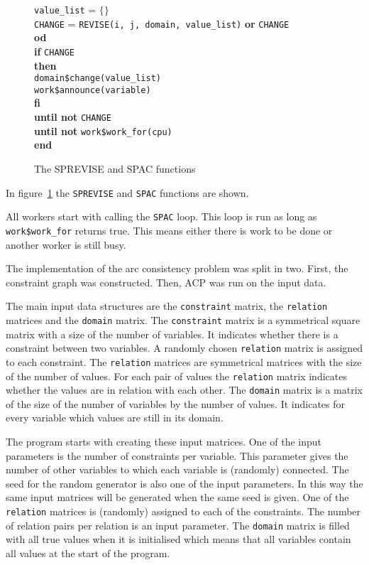 \documentclass[a4paper,11pt]{article}
\begin{document}
\begin{figure}[htbp]
\begin{center}
\begin{tabbing}
\> \> \> \> \> {\tt value\_list} = $\{\}$ \\
\> \> \> \> \> {\tt CHANGE} = {\tt REVISE(i, j, domain, value\_list)}
{\bf or} {\tt CHANGE} \\
\> \> \> \> {\bf od} \\
\> \> \> \> {\bf if} {\tt CHANGE} \\
\> \> \> \> {\bf then} \\
\> \> \> \> \> {\tt domain\$change(value\_list)} \\
\> \> \> \> \> {\tt work\$announce(variable)} \\
\> \> \> \> {\bf fi} \\
\> \> \> {\bf until not} {\tt CHANGE} \\
\> \> {\bf until not} {\tt work\$work\_for(cpu)} \\
\> {\bf end}
\end{tabbing}
\caption{The SPREVISE and SPAC functions}
\label{fig:spac}
\end{center}
\end{figure}
In
figure~\ref{fig:spac} the {\tt SPREVISE} and {\tt SPAC} functions are shown.

All workers start with calling the {\tt SPAC} loop. This loop
is run as long as {\tt work\$work\_for} returns true.
This means either there is work to be done or another worker is still
busy.

The implementation of the arc consistency problem was split in two. First,
the constraint graph was constructed. Then, ACP was run on the input data.

The main input data structures are the {\tt constraint} matrix, 
the {\tt relation} matrices and the {\tt domain} matrix.
The {\tt constraint}
matrix is a symmetrical
square matrix with a size of the number of variables. It
indicates whether there is a constraint between two variables. A randomly
chosen {\tt relation} matrix is assigned to each constraint.
The {\tt relation} matrices are symmetrical matrices with the size of the
number of values.
For each pair of values the {\tt relation} matrix indicates whether the
values are in relation with each other.
The {\tt domain} matrix is a matrix of the size of the number of variables
by the number of values. It indicates for every variable which values
are still in its domain.

The program starts with creating these input matrices. One of the input
parameters is the number of constraints per variable. This parameter gives
the number of other variables to which each variable is (randomly) connected.
The seed for the random generator is also one
of the input parameters. In this way the same input matrices will be
generated when the same seed is given. One of the {\tt relation} matrices
is (randomly) assigned to each of the constraints.
The number of relation pairs
per relation is an input parameter. 
The {\tt domain} matrix
is filled with all true values when it is initialised which means that
all variables contain all values at the start of the program.
\end{document}
